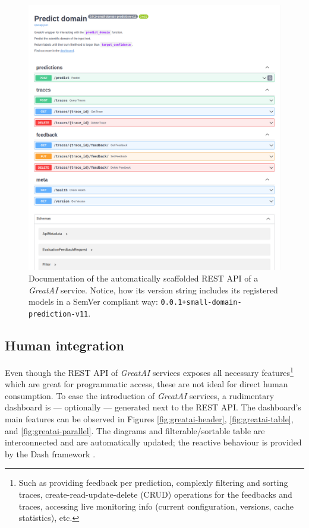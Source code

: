 \begin{figure}
    \centering
    \includegraphics[width=0.85\linewidth]{figures/greatai-api.png}
    \captionsetup{width=.9\linewidth}
    \caption{Documentation of the automatically scaffolded REST API of a \textit{GreatAI} service. Notice, how its version string includes its registered models in a SemVer compliant way: \texttt{0.0.1+small-domain-prediction-v11}.}
    \label{fig:greatai-api}
\end{figure}

\subsection{Human integration}

Even though the REST API of \textit{GreatAI} services exposes all necessary features\footnote{Such as providing feedback per prediction, complexly filtering and sorting traces, create-read-update-delete (CRUD) operations for the feedbacks and traces, accessing live monitoring info (current configuration, versions, cache statistics), etc.} which are great for programmatic access, these are not ideal for direct human consumption. To ease the introduction of \textit{GreatAI} services, a rudimentary dashboard is --- optionally --- generated next to the REST API. The dashboard's main features can be observed in Figures \ref{fig:greatai-header}, \ref{fig:greatai-table}, and \ref{fig:greatai-parallel}. The diagrams and filterable/sortable table are interconnected and are automatically updated; the reactive behaviour is provided by the Dash framework \cite{shammamah_hossain-proc-scipy-2019}.

